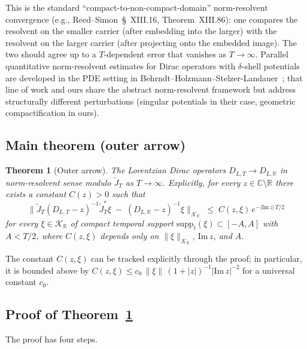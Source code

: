\documentclass[11pt,a4paper]{article}
\theoremstyle{plain}
\newtheorem{theorem}{Theorem}[section]
\theoremstyle{definition}
\newcommand{\Krein}{\mathcal{K}}
\newcommand{\norm}[1]{\lVert #1 \rVert}
\newcommand{\R}{\mathbb{R}}
\newcommand{\C}{\mathbb{C}}
\newcommand{\DLR}{D_{L,\R}}
\newcommand{\DLT}{D_{L,T}}
\newcommand{\JT}{\widetilde{J}_{T}}
\begin{document}
This is the standard ``compact-to-non-compact-domain'' norm-resolvent
convergence (e.g., Reed--Simon~\S~XIII.16, Theorem~XIII.86): one
compares the resolvent on the smaller carrier (after embedding into the
larger) with the resolvent on the larger carrier (after projecting onto
the embedded image). The two should agree up to a $T$-dependent error
that vanishes as $T \to \infty$. Parallel quantitative norm-resolvent
estimates for Dirac operators with $\delta$-shell potentials are
developed in the PDE setting in
Behrndt--Holzmann--Stelzer-Landauer~\cite{behrndt_holzmann_stelzer2026};
that line of work and ours share the abstract norm-resolvent framework
but address structurally different perturbations (singular potentials
in their case, geometric compactification in ours).

\subsection{Main theorem (outer arrow)}\label{sec:outer_main}

\begin{theorem}[Outer arrow]\label{thm:outer}
The Lorentzian Dirac operators $\DLT \to \DLR$ in norm-resolvent sense
modulo $\JT$ as $T \to \infty$. Explicitly, for every
$z \in \C\setminus\R$ there exists a constant $C(z) > 0$ such that
\begin{equation}\label{eq:outer_bound}
\bigl\| \JT (\DLT - z)^{-1} \JT^{*} \xi
\;-\; (\DLR - z)^{-1} \xi \bigr\|_{\Krein_{\R}}
\;\le\; C(z, \xi)\,e^{-|\mathrm{Im}\,z|\,T/2}
\end{equation}
for every $\xi \in \Krein_{\R}$ of compact temporal support
$\mathrm{supp}_{t}(\xi) \subset [-A, A]$ with $A < T/2$, where
$C(z, \xi)$ depends only on $\norm{\xi}_{\Krein_{\R}}$,
$\mathrm{Im}\,z$, and $A$.
\end{theorem}

The constant $C(z, \xi)$ can be tracked explicitly through the proof;
in particular, it is bounded above by
$C(z, \xi) \le c_{0}\,\norm{\xi}\,(1 + |z|)^{-1}|\mathrm{Im}\,z|^{-2}$
for a universal constant $c_{0}$.

\subsection{Proof of Theorem~\ref{thm:outer}}\label{sec:outer_proof}

The proof has four steps.
\end{document}
